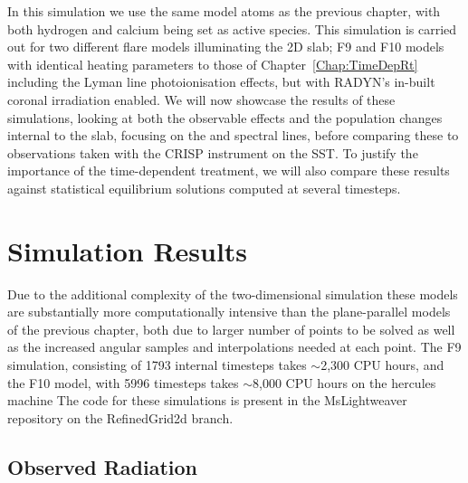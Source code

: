 In this simulation we use the same model atoms as the previous chapter, with both hydrogen and calcium being set as active species.
This simulation is carried out for two different flare models illuminating the 2D slab; F9 and F10 models with identical heating parameters to those of Chapter~\ref{Chap:TimeDepRt} including the Lyman line photoionisation effects, but with RADYN's in-built coronal irradiation enabled.
We will now showcase the results of these simulations, looking at both the observable effects and the population changes internal to the slab, focusing on the \Ha{} and \CaLine{} spectral lines, before comparing these to observations taken with the CRISP instrument on the SST.
To justify the importance of the time-dependent treatment, we will also compare these results against statistical equilibrium solutions computed at several timesteps.


\section{Simulation Results}\label{Sec:2dSimResults}

Due to the additional complexity of the two-dimensional simulation these models are substantially more computationally intensive than the plane-parallel models of the previous chapter, both due to larger number of points to be solved as well as the increased angular samples and interpolations needed at each point.
The F9 simulation, consisting of 1793 internal timesteps takes $\sim$2,300 CPU hours, and the F10 model, with 5996 timesteps takes $\sim$8,000 CPU hours on the hercules machine 
{\color{Red} The code for these simulations is present in the MsLightweaver repository on the RefinedGrid2d branch.}


\subsection{Observed Radiation}




